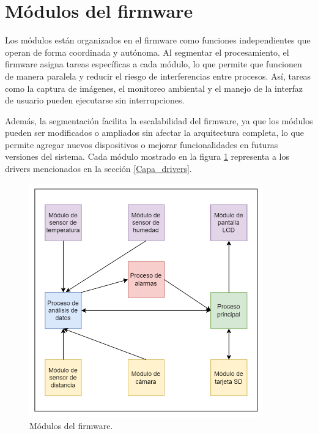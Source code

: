 \section{Módulos del firmware}

Los módulos están organizados en el firmware como funciones independientes que operan de forma coordinada y autónoma. Al segmentar el procesamiento, el firmware asigna tareas específicas a cada módulo, lo que permite que funcionen de manera paralela y reducir el riesgo de interferencias entre procesos. Así, tareas como la captura de imágenes, el monitoreo ambiental y el manejo de la interfaz de usuario pueden ejecutarse sin interrupciones.

Además, la segmentación facilita la escalabilidad del firmware, ya que los módulos pueden ser modificados o ampliados sin afectar la arquitectura completa, lo que permite agregar nuevos dispositivos o mejorar funcionalidades en futuras versiones del sistema. Cada módulo mostrado en la figura \ref{fig:modulos_del_firmware} representa a los drivers mencionados en la sección \ref{Capa_drivers}.

\newpage

\vspace{1cm}
\begin{figure}[htbp]
	\centering
	\includegraphics[width=0.9\textwidth, height=0.5\textheight]{./Figures/modulos_del_firmware.png}
	\caption{Módulos del firmware.}
	\label{fig:modulos_del_firmware}
\end{figure}
\vspace{1cm}

